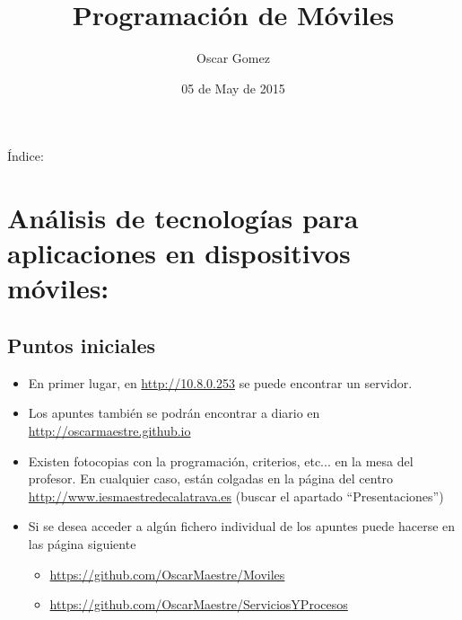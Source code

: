 \documentclass[a4paper,12pt,spanish]{sphinxmanual}
\title{Programación de Móviles}
\date{05 de May de 2015}
\author{Oscar Gomez}
\begin{document}
\maketitle
\tableofcontents
{}\label{index::doc}


Índice:


\chapter{Análisis de tecnologías para aplicaciones en dispositivos móviles:}
\label{tema1:prog-multimedia-y-de-dispositivos-moviles}\label{tema1:analisis-de-tecnologias-para-aplicaciones-en-dispositivos-moviles}\label{tema1::doc}

\section{Puntos iniciales}
\label{tema1:puntos-iniciales}\begin{itemize}
\item {} 
En primer lugar, en \href{http://10.8.0.253}{http://10.8.0.253} se puede encontrar un servidor.

\item {} 
Los apuntes también se podrán encontrar a diario en \href{http://oscarmaestre.github.io}{http://oscarmaestre.github.io}

\item {} 
Existen fotocopias con la programación, criterios, etc... en la mesa del profesor. En cualquier caso, están colgadas en la página del centro \href{http://www.iesmaestredecalatrava.es}{http://www.iesmaestredecalatrava.es} (buscar el apartado ``Presentaciones'')

\item {} 
Si se desea acceder a algún fichero individual de los apuntes puede hacerse en las página siguiente
\begin{itemize}
\item {} 
\href{https://github.com/OscarMaestre/Moviles}{https://github.com/OscarMaestre/Moviles}

\item {} 
\href{https://github.com/OscarMaestre/ServiciosYProcesos}{https://github.com/OscarMaestre/ServiciosYProcesos}

\end{itemize}

\end{itemize}
\end{document}
